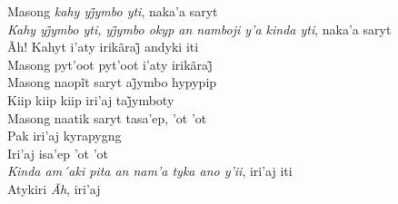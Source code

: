 \begin{linenumbers}\begingroup\raggedright
\noindent Masong \textit{kahy yj̃ymbo yti}, naka’a saryt\\
\textit{Kahy yj̃ymbo yti, yj̃ymbo okyp an namboji y’a kinda yti}, naka’a saryt\\
Ãh! Kahyt i’aty irikãraj̃ andyki iti\\
Masong pyt’oot pyt’oot i’aty irikãraj̃\\
Masong naopĩt saryt aj̃ymbo hypypip\\
Kiip kiip kiip iri’aj taj̃ymboty\\
Masong naatik saryt tasa'ep, 'ot 'ot\\
Pak iri'aj kyrapygng\\
Iri'aj isa'ep 'ot 'ot\\
\textit{Kinda am´aki pita an nam'a tyka ano y'ii}, iri'aj iti\\
Atykiri \textit{Ãh}, iri'aj

\end{linenumbers}\endgroup

\bigskip

